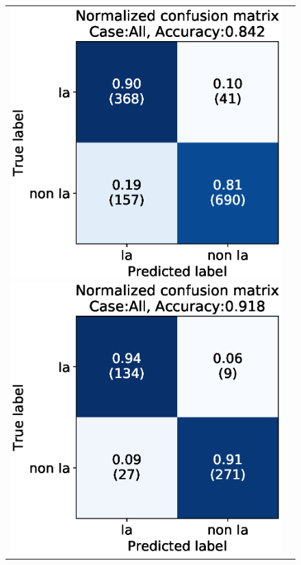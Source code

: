 \documentclass[proof]{pasj01}
\begin{document}
\begin{figure}[htbp]
    \begin{tabular}{cc}
        \begin{minipage}{0.5\hsize}
            \begin{center}
                \includegraphics[width=\columnwidth]{figures/10_CM_absolute-magnitude-scaled-flux-remove-y_SNdata_test_190522_2_Flagall_all.eps}
            \end{center}
        \end{minipage}
        \begin{minipage}{0.5\hsize}
            \begin{center}
                \includegraphics[width=\columnwidth]{figures/10_CM_absolute-magnitude-scaled-flux-remove-y_SNdata_test_190522_2_Flagall_noedge_spec.eps}

\end{center}
\end{minipage}
\end{tabular}
\end{figure}
\end{document}
